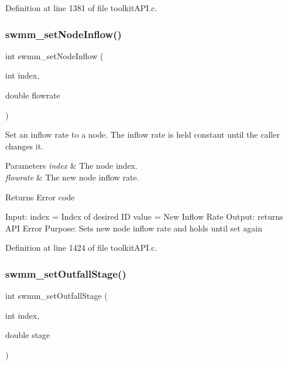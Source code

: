 Definition at line 1381 of file toolkit\+A\+P\+I.\+c.

\mbox{\label{group__tkfuncs_ga6438a8a45d7712b8b02ba630cd8e1db3}} 
\subsubsection{\texorpdfstring{swmm\+\_\+set\+Node\+Inflow()}{swmm\_setNodeInflow()}}
{\footnotesize\ttfamily int swmm\+\_\+set\+Node\+Inflow (\begin{DoxyParamCaption}\item[{int}]{index,  }\item[{double}]{flowrate }\end{DoxyParamCaption})}



Set an inflow rate to a node. The inflow rate is held constant until the caller changes it. 


\begin{DoxyParams}{Parameters}
{\em index} & The node index. \\
\hline
{\em flowrate} & The new node inflow rate. \\
\hline
\end{DoxyParams}
\begin{DoxyReturn}{Returns}
Error code
\end{DoxyReturn}
Input\+: index = Index of desired ID value = New Inflow Rate Output\+: returns A\+PI Error Purpose\+: Sets new node inflow rate and holds until set again 

Definition at line 1424 of file toolkit\+A\+P\+I.\+c.

\mbox{\label{group__tkfuncs_ga80d902400625073d8ff2c392365fde9b}} 
\subsubsection{\texorpdfstring{swmm\+\_\+set\+Outfall\+Stage()}{swmm\_setOutfallStage()}}
{\footnotesize\ttfamily int swmm\+\_\+set\+Outfall\+Stage (\begin{DoxyParamCaption}\item[{int}]{index,  }\item[{double}]{stage }\end{DoxyParamCaption})}



